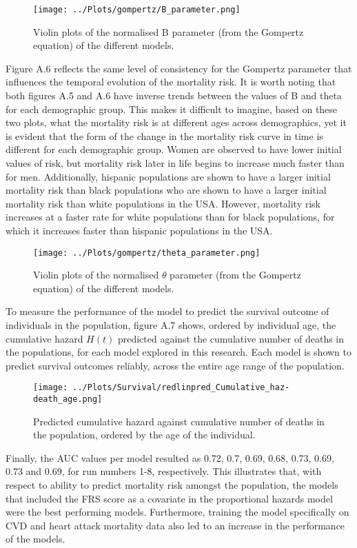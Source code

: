 \documentclass[
]{article}
\begin{document}
\begin{figure}
\centering
\texttt{[image: ../Plots/gompertz/B\_parameter.png]}
\caption{Violin plots of the normalised B parameter (from the Gompertz
equation) of the different models.}
\end{figure}

Figure A.6 reflects the same level of consistency for the Gompertz
parameter that influences the temporal evolution of the mortality risk.
It is worth noting that both figures A.5 and A.6 have inverse trends
between the values of B and theta for each demographic group. This makes
it difficult to imagine, based on these two plots, what the mortality
risk is at different ages across demographics, yet it is evident that
the form of the change in the mortality risk curve in time is different
for each demographic group. Women are observed to have lower initial
values of risk, but mortality risk later in life begins to increase much
faster than for men. Additionally, hispanic populations are shown to
have a larger initial mortality risk than black populations who are
shown to have a larger initial mortality risk than white populations in
the USA. However, mortality risk increases at a faster rate for white
populations than for black populations, for which it increases faster
than hispanic populations in the USA.

\begin{figure}
\centering
\texttt{[image: ../Plots/gompertz/theta\_parameter.png]}
\caption{Violin plots of the normalised \(\theta\) parameter (from the
Gompertz equation) of the different models.}
\end{figure}

To measure the performance of the model to predict the survival outcome
of individuals in the population, figure A.7 shows, ordered by
individual age, the cumulative hazard \(H(t)\) predicted against the
cumulative number of deaths in the populations, for each model explored
in this research. Each model is shown to predict survival outcomes
reliably, across the entire age range of the population.

\begin{figure}
\centering
\texttt{[image: ../Plots/Survival/redlinpred\_Cumulative\_haz-death\_age.png]}
\caption{Predicted cumulative hazard against cumulative number of deaths
in the population, ordered by the age of the individual.}
\end{figure}

Finally, the AUC values per model resulted as 0.72, 0.7, 0.69, 0.68,
0.73, 0.69, 0.73 and 0.69, for run numbers 1-8, respectively. This
illustrates that, with respect to ability to predict mortality risk
amongst the population, the models that included the FRS score as a
covariate in the proportional hazards model were the best performing
models. Furthermore, training the model specifically on CVD and heart
attack mortality data also led to an increase in the performance of the
models.
\end{document}
